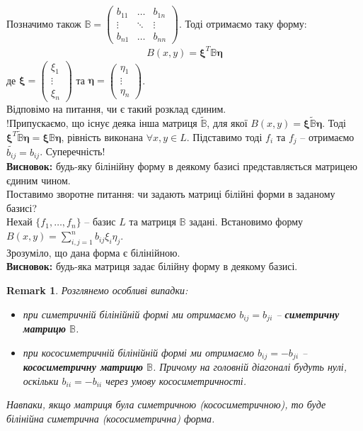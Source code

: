 \documentclass[a4paper, 10pt]{article}
\theoremstyle{theoremdd}
\newtheorem{remark}[theorem]{Remark}
\begin{document}
Позначимо також $\mathbb{B} = \begin{pmatrix}
b_{11} & \dots & b_{1n} \\
\vdots & \ddots & \vdots \\
b_{n1} & \dots & b_{nn}
\end{pmatrix}$. Тоді отримаємо таку форму:
\begin{align*}
B(x,y) = \bm{\xi}^T \mathbb{B} \bm{\eta}
\end{align*}
де $\bm{\xi} = \begin{pmatrix}
\xi_1 \\ \vdots \\ \xi_n
\end{pmatrix}$ та $\bm{\eta} = \begin{pmatrix}
\eta_1 \\ \vdots \\ \eta_n
\end{pmatrix}$.\\
Відповімо на питання, чи є такий розклад єдиним. \\
!Припускаємо, що існує деяка інша матриця $\widetilde{\mathbb{B}}$, для якої $B(x,y) = \bm{\xi} \widetilde{\mathbb{B}} \bm{\eta}$. Тоді $\bm{\xi}^T \widetilde{\mathbb{B}} \bm{\eta} = \bm{\xi} \mathbb{B} \bm{\eta}$, рівність виконана $\forall x,y \in L$. Підставимо тоді $f_i$ та $f_j$ -- отримаємо $\widetilde{b_{ij}} = b_{ij} $. Суперечність!\\
\textbf{Висновок:} будь-яку білінійну форму в деякому базисі представляється матрицею єдиним чином.
\bigskip \\
Поставимо зворотне питання: чи задають матриці білійні форми в заданому базисі?\\
Нехай $\{f_1,\dots,f_n\}$ -- базис $L$ та матриця $\mathbb{B}$ задані. Встановимо форму $B(x,y) = \displaystyle\sum_{i,j=1}^n b_{ij}\xi_i \eta_j$.\\
Зрозуміло, що дана форма є білінійною.\\
\textbf{Висновок:} будь-яка матриця задає білійну форму в деякому базисі.

\begin{remark}
Розглянемо особливі випадки:
\begin{itemize}[label={-}, nosep, wide=0pt]
\item при симетричній білінійній формі ми отримаємо $b_{ij} = b_{ji}$ -- \textbf{симетричну матрицю} $\mathbb{B}$.
\item при кососиметричній білінійній формі ми отримаємо $b_{ij} = -b_{ji}$ -- \textbf{кососиметричну матрицю} $\mathbb{B}$. Причому на головній діагоналі будуть нулі, оскільки $b_{ii} = -b_{ii}$ через умову кососиметричності.
\end{itemize}
Навпаки, якщо матриця була симетричною (кососиметричною), то буде білінійна симетрична (кососиметрична) форма.
\end{remark}
\end{document}
